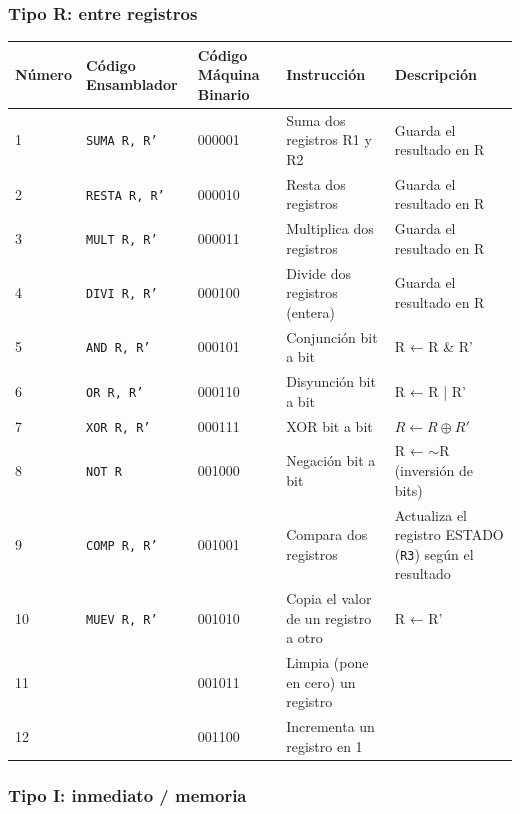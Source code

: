 \documentclass{article}
\begin{document}
\subsubsection{Tipo R: \textbf{entre registros}}

\begin{table}[H]
    \centering
    \begin{tabular}{|p{1.3cm}|p{3cm}|p{1.6cm}|p{5cm}|p{4cm}|}
    \hline
    \textbf{Número} & \textbf{Código Ensamblador} & \textbf{Código Máquina Binario} & \textbf{Instrucción} & \textbf{Descripción} \\
    \hline
    1  & \texttt{SUMA R, R'} & 000001 & Suma dos registros R1 y R2 & Guarda el resultado en R \\
    \hline
    2  & \texttt{RESTA R, R'} & 000010 & Resta dos registros & Guarda el resultado en R \\
    \hline
    3  & \texttt{MULT R, R'} & 000011 & Multiplica dos registros & Guarda el resultado en R \\
    \hline
    4  & \texttt{DIVI R, R'} & 000100 & Divide dos registros (entera) & Guarda el resultado en R \\
    \hline
    5  & \texttt{AND R, R'} & 000101 & Conjunción bit a bit & R ← R \& R' \\
    \hline
    6  & \texttt{OR R, R'} & 000110 & Disyunción bit a bit & R ← R | R' \\
    \hline
    7  & \texttt{XOR R, R'} & 000111 & XOR bit a bit & $R \leftarrow R \oplus R'$ \\
    \hline
    8  & \texttt{NOT R} & 001000 & Negación bit a bit & R ← $\sim$R (inversión de bits) \\
    \hline
    9  & \texttt{COMP R, R'} & 001001 & Compara dos registros & Actualiza el registro ESTADO (\texttt{R3}) según el resultado \\
    \hline
    10 & \texttt{MUEV R, R'} & 001010 & Copia el valor de un registro a otro & R ← R' \\
    \hline
    11 & & 001011 & Limpia (pone en cero) un registro & \\
    \hline
    12 & & 001100 & Incrementa un registro en 1 & \\
    \hline
    \end{tabular}
\end{table}

\subsubsection{Tipo I: \textbf{inmediato / memoria}}
\end{document}

